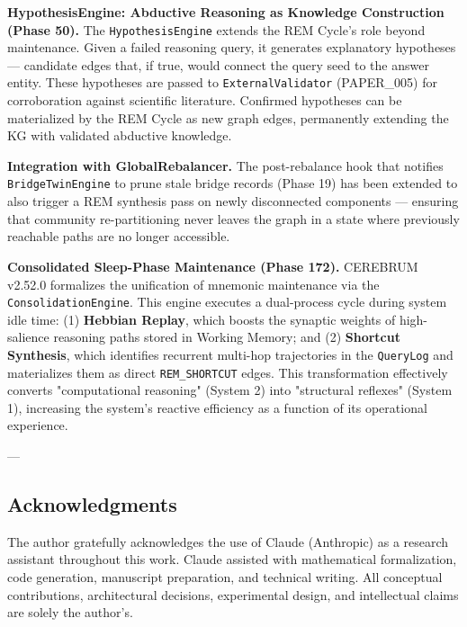 \textbf{HypothesisEngine: Abductive Reasoning as Knowledge Constr\-uction (Phase 50).} The \texttt{HypothesisEngine} extends the REM Cycle's role beyond maintenance. Given a failed reasoning query, it generates explanatory hypotheses — candidate edges that, if true, would connect the query seed to the answer entity. These hypotheses are passed to \texttt{ExternalValidator} (PAPER\_005) for corro\-boration against scientific literature. Confirmed hypotheses can be mater\-ialized by the REM Cycle as new graph edges, permanently extending the KG with validated abductive knowledge.

\textbf{Integration with GlobalRebalancer.} The post-rebalance hook that notifies \texttt{BridgeTwinEngine} to prune stale bridge records (Phase 19) has been extended to also trigger a REM synthesis pass on newly disco\-nnected components — ensuring that community re-parti\-tioning never leaves the graph in a state where previously reachable paths are no longer accessible.

\textbf{Consol\-idated Sleep-Phase Maintenance (Phase 172).} CEREBRUM v2.52.0 formalizes the unification of mnemonic maintenance via the \texttt{ConsolidationEngine}. This engine executes a dual-process cycle during system idle time: (1) \textbf{Hebbian Replay}, which boosts the synaptic weights of high-salience reasoning paths stored in Working Memory; and (2) \textbf{Shortcut Synthesis}, which identifies recurrent multi-hop traje\-ctories in the \texttt{QueryLog} and mater\-ializes them as direct \texttt{REM\_SHORTCUT} edges. This trans\-formation effectively converts "compu\-tational reasoning" (System 2) into "structural reflexes" (System 1), increasing the system's reactive efficiency as a function of its operational experience.

---
\subsection{Acknow\-ledgments}

The author gratefully ackno\-wledges the use of Claude (Anthropic) as a research assistant throughout this work. Claude assisted with mathe\-matical forma\-lization, code generation, manuscript preparation, and technical writing. All conceptual contr\-ibutions, archi\-tectural decisions, exper\-imental design, and intel\-lectual claims are solely the author's.

